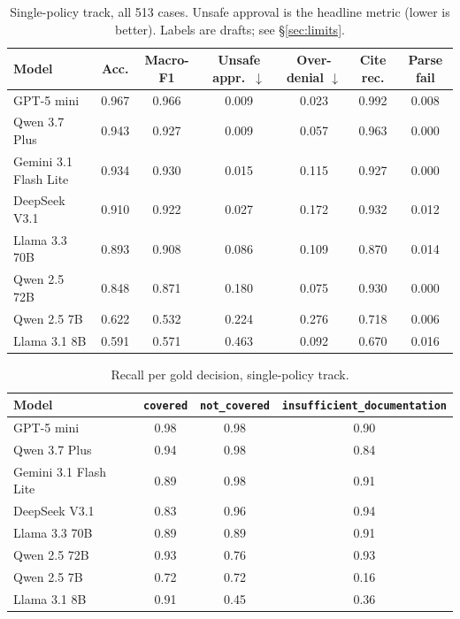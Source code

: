 \documentclass[11pt]{article}
\newcommand{\cov}{\texttt{covered}}
\newcommand{\ncov}{\texttt{not\_covered}}
\newcommand{\insuf}{\texttt{insufficient\_documentation}}
\begin{document}
\begin{table}[t]
\centering
\small
\caption{Single-policy track, all 513 cases. Unsafe approval is the headline metric (lower is
better). Labels are drafts; see \S\ref{sec:limits}.}
\label{tab:main}
\begin{tabular}{lcccccc}
\toprule
Model & Acc. & Macro-F1 & Unsafe appr.\ $\downarrow$ & Over-denial $\downarrow$ & Cite rec. & Parse fail \\
\midrule
GPT-5 mini            & 0.967 & 0.966 & 0.009 & 0.023 & 0.992 & 0.008 \\
Qwen 3.7 Plus         & 0.943 & 0.927 & 0.009 & 0.057 & 0.963 & 0.000 \\
Gemini 3.1 Flash Lite & 0.934 & 0.930 & 0.015 & 0.115 & 0.927 & 0.000 \\
DeepSeek V3.1         & 0.910 & 0.922 & 0.027 & 0.172 & 0.932 & 0.012 \\
Llama 3.3 70B         & 0.893 & 0.908 & 0.086 & 0.109 & 0.870 & 0.014 \\
Qwen 2.5 72B          & 0.848 & 0.871 & 0.180 & 0.075 & 0.930 & 0.000 \\
Qwen 2.5 7B           & 0.622 & 0.532 & 0.224 & 0.276 & 0.718 & 0.006 \\
Llama 3.1 8B          & 0.591 & 0.571 & 0.463 & 0.092 & 0.670 & 0.016 \\
\bottomrule
\end{tabular}
\end{table}

\begin{table}[t]
\centering
\small
\caption{Recall per gold decision, single-policy track.}
\label{tab:recall}
\begin{tabular}{lccc}
\toprule
Model & \cov{} & \ncov{} & \insuf{} \\
\midrule
GPT-5 mini            & 0.98 & 0.98 & 0.90 \\
Qwen 3.7 Plus         & 0.94 & 0.98 & 0.84 \\
Gemini 3.1 Flash Lite & 0.89 & 0.98 & 0.91 \\
DeepSeek V3.1         & 0.83 & 0.96 & 0.94 \\
Llama 3.3 70B         & 0.89 & 0.89 & 0.91 \\
Qwen 2.5 72B          & 0.93 & 0.76 & 0.93 \\
Qwen 2.5 7B           & 0.72 & 0.72 & 0.16 \\
Llama 3.1 8B          & 0.91 & 0.45 & 0.36 \\
\bottomrule
\end{tabular}
\end{table}
\end{document}
